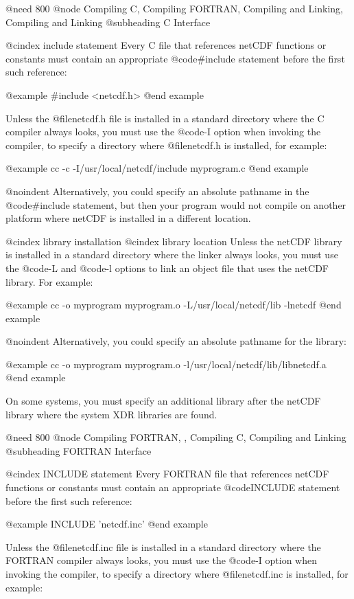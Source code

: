 @need 800
@node Compiling C, Compiling FORTRAN, Compiling and Linking, Compiling and Linking
@subheading C Interface

@cindex include statement
Every C file that references netCDF functions or constants must contain
an appropriate @code{#include} statement before the first such reference:

@example
#include <netcdf.h>
@end example

Unless the @file{netcdf.h} file is installed in a standard directory
where the C compiler always looks, you must use the @code{-I}
option when invoking the compiler, to specify a directory where
@file{netcdf.h} is installed, for example:

@example
cc -c -I/usr/local/netcdf/include myprogram.c
@end example

@noindent
Alternatively, you could specify an absolute pathname in the
@code{#include} statement, but then your program would not compile on
another platform where netCDF is installed in a different location.

@cindex library installation
@cindex library location
Unless the netCDF library is installed in a standard directory where the
linker always looks, you must use the @code{-L} and @code{-l} options
to link an object file that uses the netCDF library.  For example:

@example
cc -o myprogram myprogram.o -L/usr/local/netcdf/lib -lnetcdf
@end example

@noindent
Alternatively, you could specify an absolute pathname for the library:

@example
cc -o myprogram myprogram.o -l/usr/local/netcdf/lib/libnetcdf.a
@end example

On some systems, you must specify an additional library after the netCDF
library where the system XDR libraries are found.

@need 800
@node Compiling FORTRAN,  , Compiling C, Compiling and Linking
@subheading FORTRAN Interface

@cindex INCLUDE statement
Every FORTRAN file that references netCDF functions or constants must contain
an appropriate @code{INCLUDE} statement before the first such reference:

@example
INCLUDE 'netcdf.inc'
@end example

Unless the @file{netcdf.inc} file is installed in a standard directory
where the FORTRAN compiler always looks, you must use the @code{-I}
option when invoking the compiler, to specify a directory where
@file{netcdf.inc} is installed, for example:

